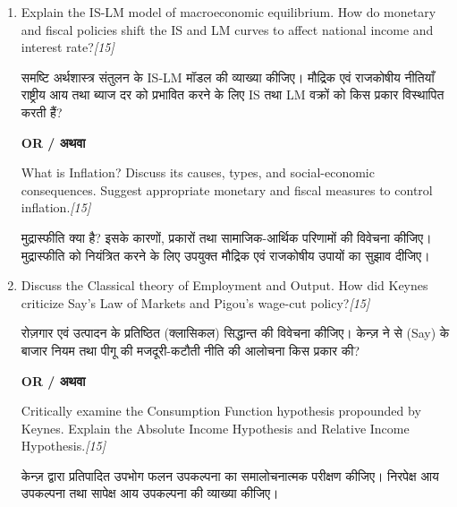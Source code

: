 \documentclass[11pt,a4paper]{article}
\newcommand{\pts}[1]{\hfill \textit{[#1]}}
\begin{document}
\begin{enumerate}[label=\textbf{\arabic*.},leftmargin=*,start=5,itemsep=14pt]

  \item Explain the IS-LM model of macroeconomic equilibrium. How do monetary and fiscal policies shift the IS and LM curves to affect national income and interest rate?\pts{15}
  
  समष्टि अर्थशास्त्र संतुलन के IS-LM मॉडल की व्याख्या कीजिए। मौद्रिक एवं राजकोषीय नीतियाँ राष्ट्रीय आय तथा ब्याज दर को प्रभावित करने के लिए IS तथा LM वक्रों को किस प्रकार विस्थापित करती हैं?

  \begin{center}\textbf{OR / अथवा}\end{center}

  What is Inflation? Discuss its causes, types, and social-economic consequences. Suggest appropriate monetary and fiscal measures to control inflation.\pts{15}
  
  मुद्रास्फीति क्या है? इसके कारणों, प्रकारों तथा सामाजिक-आर्थिक परिणामों की विवेचना कीजिए। मुद्रास्फीति को नियंत्रित करने के लिए उपयुक्त मौद्रिक एवं राजकोषीय उपायों का सुझाव दीजिए।

  \item Discuss the Classical theory of Employment and Output. How did Keynes criticize Say's Law of Markets and Pigou's wage-cut policy?\pts{15}
  
  रोज़गार एवं उत्पादन के प्रतिष्ठित (क्लासिकल) सिद्धान्त की विवेचना कीजिए। केन्ज़ ने से (Say) के बाजार नियम तथा पीगू की मजदूरी-कटौती नीति की आलोचना किस प्रकार की?

  \begin{center}\textbf{OR / अथवा}\end{center}

  Critically examine the Consumption Function hypothesis propounded by Keynes. Explain the Absolute Income Hypothesis and Relative Income Hypothesis.\pts{15}
  
  केन्ज़ द्वारा प्रतिपादित उपभोग फलन उपकल्पना का समालोचनात्मक परीक्षण कीजिए। निरपेक्ष आय उपकल्पना तथा सापेक्ष आय उपकल्पना की व्याख्या कीजिए।

\end{enumerate}
\end{document}
